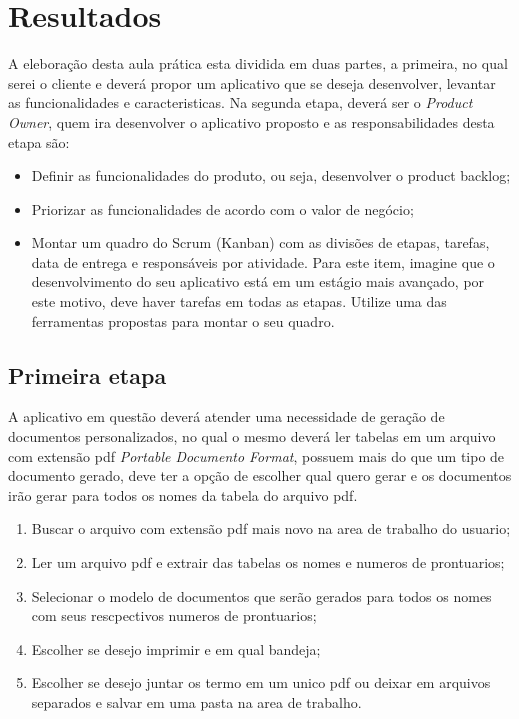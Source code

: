 \section{Resultados}
\par A eleboração desta aula prática esta dividida em duas partes, a primeira, no qual serei o cliente e deverá propor um aplicativo que se deseja desenvolver, levantar as funcionalidades e caracteristicas. Na segunda etapa, deverá ser o \textit{Product Owner}, quem ira desenvolver o aplicativo proposto e as responsabilidades desta etapa são:
\begin{itemize}
  \item Definir as funcionalidades do produto, ou seja, desenvolver o product backlog;
  \item Priorizar as funcionalidades de acordo com o valor de negócio;
  \item Montar um quadro do Scrum (Kanban) com as divisões de etapas, tarefas, data de entrega e responsáveis por atividade. Para este item, imagine que o desenvolvimento do seu aplicativo está em um estágio mais avançado, por este motivo, deve haver tarefas em todas as etapas. Utilize uma das ferramentas propostas para montar o seu quadro.
\end{itemize}

\subsection{Primeira etapa}
\par A aplicativo em questão deverá atender uma necessidade de geração de documentos personalizados, no qual o mesmo deverá ler tabelas em um arquivo com extensão pdf \textit{Portable Documento Format}, possuem mais do que um tipo de documento gerado, deve ter a opção de escolher qual quero gerar e os documentos irão gerar para todos os nomes da tabela do arquivo pdf.
\begin{enumerate}
  \item Buscar o arquivo com extensão pdf mais novo na area de trabalho do usuario;
  \item Ler um arquivo pdf e extrair das tabelas os nomes e numeros de prontuarios;
  \item Selecionar o modelo de documentos que serão gerados para todos os nomes com seus rescpectivos numeros de prontuarios;
  \item Escolher se desejo imprimir e em qual bandeja;
  \item Escolher se desejo juntar os termo em um unico pdf ou deixar em arquivos separados e salvar em uma pasta na area de trabalho.

\end{enumerate}\label{productlog}

